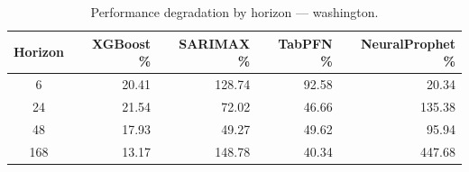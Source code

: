 \begin{table}[h]
\centering
\caption{Performance degradation by horizon — washington.}
\label{tab:degradation_horizon_washington}
\begin{tabular}{crrrr}
\toprule
Horizon & XGBoost \% & SARIMAX \% & TabPFN \% & NeuralProphet \% \\
\midrule
6 & 20.41 & 128.74 & 92.58 & 20.34 \\
24 & 21.54 & 72.02 & 46.66 & 135.38 \\
48 & 17.93 & 49.27 & 49.62 & 95.94 \\
168 & 13.17 & 148.78 & 40.34 & 447.68 \\
\bottomrule
\end{tabular}
\end{table}
